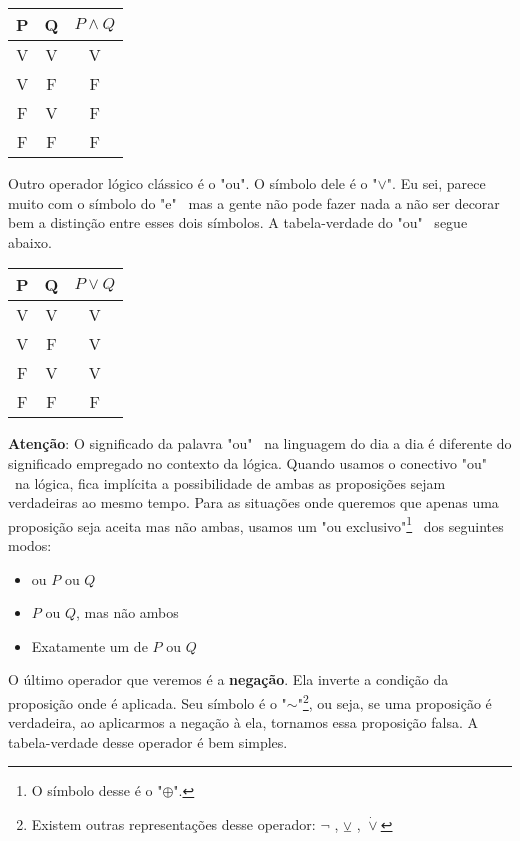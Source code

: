 \documentclass[a4paper,11pt]{book}
\theoremstyle{definition}
\theoremstyle{break}
\begin{document}
\begin{center}
\begin{tabular}{| c c || c | }
\hline
 P & Q & $P \land Q$ \\ 
 \hline
 V & V & V \\  
 V & F & F \\  
 F & V & F \\  
 F & F & F \\
 \hline
\end{tabular}
\end{center}

Outro operador lógico clássico é o "ou". O símbolo dele é o "$\lor$". Eu sei, parece muito com o símbolo do "e" \ mas a  gente não pode fazer nada a não ser decorar bem a distinção entre esses dois símbolos. A tabela-verdade do "ou" \ segue abaixo.

\begin{center}
\begin{tabular}{ | c c || c | }
\hline
 P & Q & $P \lor Q$ \\ 
 \hline
 V & V & V \\  
 V & F & V \\  
 F & V & V \\  
 F & F & F \\
 \hline
\end{tabular}
\end{center}

\textbf{Atenção}: O significado da palavra "ou" \ na linguagem do dia a dia é diferente do significado empregado no contexto da lógica. Quando usamos o conectivo "ou" \ na lógica, fica implícita a possibilidade de ambas as proposições sejam verdadeiras ao mesmo tempo. Para as situações onde queremos que apenas uma proposição seja aceita mas não ambas, usamos um "ou exclusivo"\footnote{O símbolo desse é o "$\oplus$".} \ dos seguintes modos: 

\begin{itemize}
\item ou $P$ ou $Q$
\item $P$ ou $Q$, mas não ambos
\item Exatamente um de $P$ ou $Q$
\end{itemize}

O último operador que veremos é a \textbf{negação}. Ela inverte a condição da proposição onde é aplicada. Seu símbolo é o "$\sim$"\footnote{Existem outras representações desse operador: $\lnot$ , $\veebar$ , $\dot\lor$}, ou seja, se uma proposição é verdadeira, ao aplicarmos a negação à ela, tornamos essa proposição falsa. A tabela-verdade desse operador é bem simples.
\end{document}
